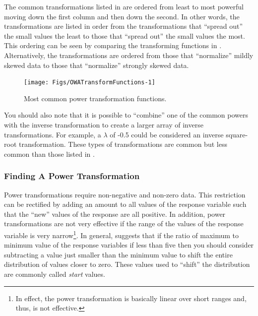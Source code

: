 \documentclass[10pt,openany]{book}\usepackage[]{graphicx}\usepackage[]{color}
\newenvironment{knitrout}{}{} %
\begin{document}
The common transformations listed in  are ordered from least to most powerful moving down the first column and then down the second.  In other words, the transformations are listed in order from the transformations that ``spread out'' the small values the least to those that ``spread out'' the small values the most.  This ordering can be seen by comparing the transforming functions in .  Alternatively, the transformations are ordered from those that ``normalize'' mildly skewed data to those that ``normalize'' strongly skewed data.

\begin{knitrout}
\color{fgcolor}\begin{figure}[hbtp]

{\centering \texttt{[image: Figs/OWATransformFunctions-1]} 

}

\caption[Most common power transformation functions]{Most common power transformation functions.}\label{fig:OWATransformFunctions}
\end{figure}


\end{knitrout}

You should also note that it is possible to ``combine'' one of the common powers with the inverse transformation to create a larger array of inverse transformations.  For example, a $\lambda$ of -0.5 could be considered an inverse square-root transformation.  These types of transformations are common but less common than those listed in .

\subsubsection{Finding A Power Transformation}
Power transformations require non-negative and non-zero data.  This restriction can be rectified by adding an amount to all values of the response variable such that the ``new'' values of the response are all positive.  In addition, power transformations are not very effective if the range of the values of the response variable is very narrow\footnote{In effect, the power transformation is basically linear over short ranges and, thus, is not effective.}.  In general, \cite{Fox1997} suggests that if the ratio of maximum to minimum value of the response variables if less than five then you should consider subtracting a value just smaller than the minimum value to shift the entire distribution of values closer to zero.  These values used to ``shift'' the distribution are commonly called \emph{start} values.
\end{document}
